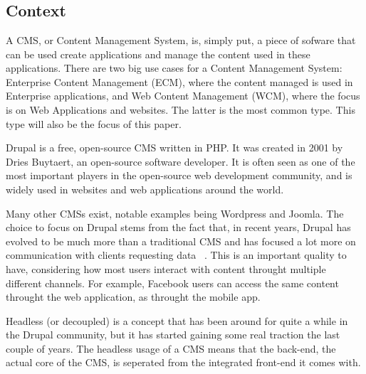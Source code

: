 
\chapter{}
\label{ch:inleiding}

\section{Context}
A \gls{CMS}, or Content Management System, is, simply put, a piece of sofware that can be used create applications and manage the content used in these applications. There are two big use cases for a Content Management System: Enterprise Content Management (ECM), where the content managed is used in Enterprise applications, and Web Content Management (WCM), where the focus is on Web Applications and websites. The latter is the most common type. This type will also be the focus of this paper.

\gls{Drupal} is a free, open-source CMS written in \gls{PHP}. It was created in 2001 by Dries Buytaert, an open-source software developer. It is often seen as one of the most important players in the open-source web development community, and is widely used in websites and web applications around the world.

Many other CMSs exist, notable examples being \gls{Wordpress} and \gls{Joomla}. The choice to focus on Drupal stems from the fact that, in recent years, Drupal has evolved to be much more than a traditional CMS and has focused a lot more on communication with clients requesting data ~\autocite{So2018}. This is an important quality to have, considering how most users interact with content throught multiple different channels. For example, Facebook users can access the same content throught the web application, as throught the mobile app.

\gls{Headless} (or decoupled) is a concept that has been around for quite a while in the Drupal community, but it has started gaining some real traction the last couple of years. The headless usage of a CMS means that the back-end, the actual core of the CMS, is seperated from the integrated front-end it comes with. 

\section{}
\label{sec:probleemstelling}

